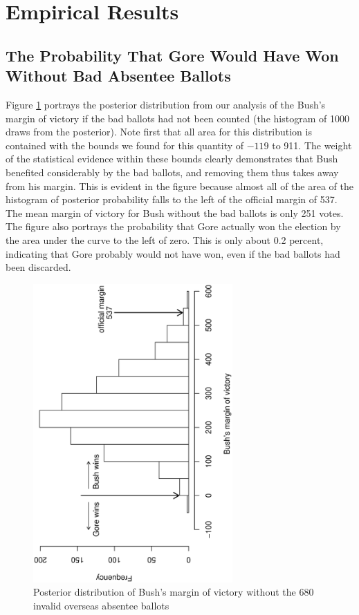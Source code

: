 \documentclass[11pt,titlepage]{article}
\begin{document}
\section{Empirical Results}
\label{s:outcome}

\subsection{The Probability That Gore Would Have Won Without Bad 
Absentee Ballots}

Figure \ref{fg:margin} portrays the posterior distribution from our
analysis of the Bush's margin of victory if the bad ballots had not
been counted (the histogram of 1000 draws from the posterior).  Note
first that all area for this distribution is contained with the bounds
we found for this quantity of $-119$ to 911.  The weight of the
statistical evidence within these bounds clearly demonstrates that
Bush benefited considerably by the bad ballots, and removing them thus
takes away from his margin.  This is evident in the figure because
almost all of the area of the histogram of posterior probability falls
to the left of the official margin of 537.  The mean margin of victory
for Bush without the bad ballots is only 251 votes.  The figure also
portrays the probability that Gore actually won the election by the
area under the curve to the left of zero.  This is only about 0.2
percent, indicating that Gore probably would not have won, even if the
bad ballots had been discarded.
\begin{figure}[t]
\begin{center}
\includegraphics[width=3in,height=4.5in,angle=-90]{margin}
\caption{Posterior distribution of Bush's margin of victory without the
  680 invalid overseas absentee ballots} \label{fg:margin}
\end{center} 
\end{figure}
\end{document}
